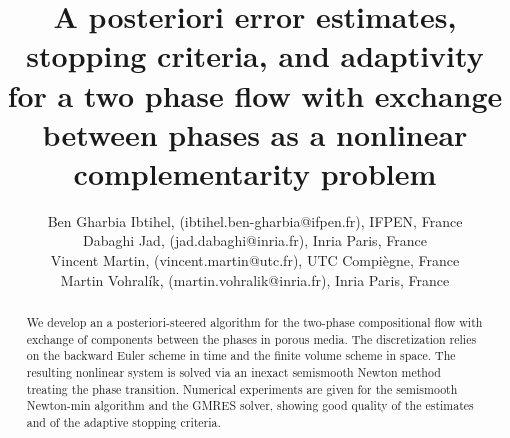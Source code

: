 \documentclass{cmwr2018}[10]
\title{A posteriori error estimates, stopping criteria, and adaptivity for a two phase flow with exchange between phases as a nonlinear complementarity problem}
\author{Ben Gharbia Ibtihel, (ibtihel.ben-gharbia@ifpen.fr), IFPEN, France \\
Dabaghi Jad, (jad.dabaghi@inria.fr), Inria Paris, France\\
Vincent Martin, (vincent.martin@utc.fr), UTC Compiègne, France\\
Martin Vohral\'ik, (martin.vohralik@inria.fr), Inria Paris, France}
\begin{document}
\maketitle


\begin{abstract}
\label{ref:abstract}
We develop an a posteriori-steered algorithm for the two-phase compositional flow with exchange of components between the phases in porous media. The discretization relies on the backward Euler scheme in time and the finite volume scheme in space. The resulting nonlinear system is solved via an inexact semismooth Newton method treating the phase transition. Numerical experiments are given for the semismooth Newton-min algorithm and the GMRES solver, showing good quality of the  estimates and of the adaptive stopping criteria.
\end{abstract}
\end{document}
